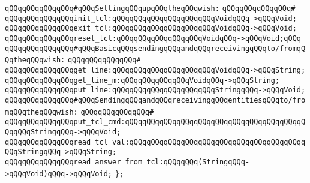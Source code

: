 \verb|qQQqqQQqqQQqqQQq#qQQqSettingqQQqupqQQqtheqQQqwish:|\newline
\verb|qQQqqQQqqQQqqQQq#|\newline
\verb|qQQqqQQqqQQqqQQqinit_tcl:qQQqqQQqqQQqqQQqqQQqqQQqVoidqQQq->qQQqVoid;|\newline
\verb|qQQqqQQqqQQqqQQqexit_tcl:qQQqqQQqqQQqqQQqqQQqqQQqVoidqQQq->qQQqVoid;|\newline
\verb|qQQqqQQqqQQqqQQqreset_tcl:qQQqqQQqqQQqqQQqqQQqVoidqQQq->qQQqVoid;qQQq|\newline
\newline
\verb|qQQqqQQqqQQqqQQq#qQQqBasicqQQqsendingqQQqandqQQqreceivingqQQqto/fromqQQqtheqQQqwish:|\newline
\verb|qQQqqQQqqQQqqQQq#|\newline
\verb|qQQqqQQqqQQqqQQqget_line:qQQqqQQqqQQqqQQqqQQqqQQqVoidqQQq->qQQqString;|\newline
\verb|qQQqqQQqqQQqqQQqget_line_m:qQQqqQQqqQQqqQQqVoidqQQq->qQQqString;|\newline
\verb|qQQqqQQqqQQqqQQqput_line:qQQqqQQqqQQqqQQqqQQqqQQqStringqQQq->qQQqVoid;|\newline
\newline
\newline
\verb|qQQqqQQqqQQqqQQq#qQQqSendingqQQqandqQQqreceivingqQQqentitiesqQQqto/fromqQQqtheqQQqwish:|\newline
\verb|qQQqqQQqqQQqqQQq#|\newline
\verb|qQQqqQQqqQQqqQQqput_tcl_cmd:qQQqqQQqqQQqqQQqqQQqqQQqqQQqqQQqqQQqqQQqqQQqqQQqStringqQQq->qQQqVoid;|\newline
\verb|qQQqqQQqqQQqqQQqread_tcl_val:qQQqqQQqqQQqqQQqqQQqqQQqqQQqqQQqqQQqqQQqqQQqStringqQQq->qQQqString;|\newline
\verb|qQQqqQQqqQQqqQQqread_answer_from_tcl:qQQqqQQq(StringqQQq->qQQqVoid)qQQq->qQQqVoid;|\newline
\newline
\verb|};|\newline
\newline

